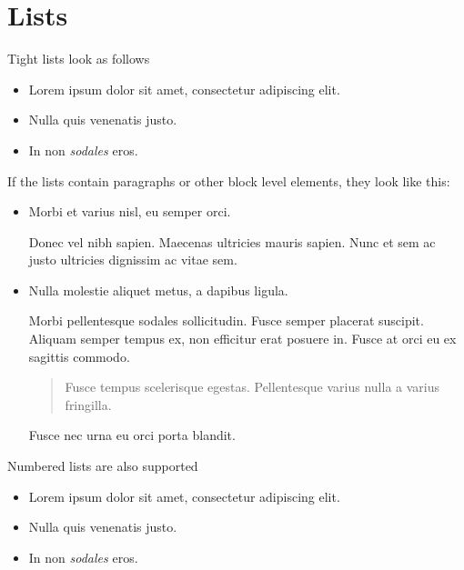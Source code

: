 \section{Lists}



\label{9958533347491084934}{}


Tight lists look as follows



\begin{itemize}
\item Lorem ipsum dolor sit amet, consectetur adipiscing elit.


\item Nulla quis venenatis justo.


\item In non \emph{sodales} eros.

\end{itemize}


If the lists contain paragraphs or other block level elements, they look like this:



\begin{itemize}
\item Morbi et varius nisl, eu semper orci.

Donec vel nibh sapien. Maecenas ultricies mauris sapien. Nunc et sem ac justo ultricies dignissim ac vitae sem.


\item Nulla molestie aliquet metus, a dapibus ligula.

Morbi pellentesque sodales sollicitudin. Fusce semper placerat suscipit. Aliquam semper tempus ex, non efficitur erat posuere in. Fusce at orci eu ex sagittis commodo.

\begin{quote}
Fusce tempus scelerisque egestas. Pellentesque varius nulla a varius fringilla.

\end{quote}
Fusce nec urna eu orci porta blandit.

\end{itemize}


Numbered lists are also supported



\begin{itemize}
\item[1. ] Lorem ipsum dolor sit amet, consectetur adipiscing elit.


\item[2. ] Nulla quis venenatis justo.


\item[3. ] In non \emph{sodales} eros.

\end{itemize}


